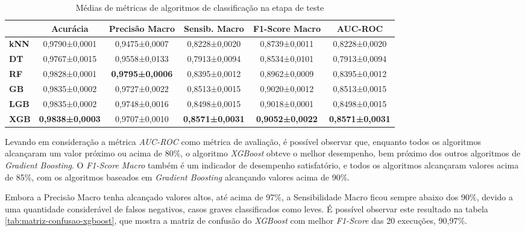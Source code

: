\begin{table}[H]
  \footnotesize
  \centering
  \begin{tabular}{l|c|c|c|c|c|}
  \cline{2-6}
  \textbf{}                          & \textbf{Acurácia}      & \textbf{Precisão Macro} & \textbf{Sensib. Macro} & \textbf{F1-Score Macro} & \textbf{AUC-ROC}       \\ \hline
  \multicolumn{1}{|l|}{\textbf{kNN}} & 0,9790±0,0001          & 0,9475±0,0007           & 0,8228±0,0020          & 0,8739±0,0011           & 0,8228±0,0020          \\ \hline
  \multicolumn{1}{|l|}{\textbf{DT}}  & 0,9767±0,0015          & 0,9558±0,0133           & 0,7913±0,0094          & 0,8534±0,0101           & 0,7913±0,0094          \\ \hline
  \multicolumn{1}{|l|}{\textbf{RF}}  & 0,9828±0,0001          & \textbf{0,9795±0,0006}  & 0,8395±0,0012          & 0,8962±0,0009           & 0,8395±0,0012          \\ \hline
  \multicolumn{1}{|l|}{\textbf{GB}}  & 0,9835±0,0002          & 0,9727±0,0022           & 0,8513±0,0015          & 0,9020±0,0012           & 0,8513±0,0015          \\ \hline
  \multicolumn{1}{|l|}{\textbf{LGB}} & 0,9835±0,0002          & 0,9748±0,0016           & 0,8498±0,0015          & 0,9018±0,0001           & 0,8498±0,0015          \\ \hline
  \multicolumn{1}{|l|}{\textbf{XGB}} & \textbf{0,9838±0,0003} & 0,9707±0,0010           & \textbf{0,8571±0,0031} & \textbf{0,9052±0,0022}  & \textbf{0,8571±0,0031} \\ \hline 
\end{tabular}
\caption{Médias de métricas de algoritmos de classificação na etapa de teste}
\label{tab:comparacao-algoritmos-normal}
\end{table}

Levando em consideração a métrica \textit{AUC-ROC} como métrica de avaliação, é possível observar que, enquanto todos os algoritmos alcançaram um valor próximo ou acima de 80\%, o algoritmo \textit{XGBoost} obteve o melhor desempenho, bem próximo dos outros algoritmos de \textit{Gradient Boosting}. O \textit{F1-Score Macro} também é um indicador de desempenho satisfatório, e todos os algoritmos alcançaram valores acima de 85\%, com os algoritmos baseados em \textit{Gradient Boosting} alcançando valores acima de 90\%. 

Embora a Precisão Macro tenha alcançado valores altos, até acima de 97\%, a Sensibilidade Macro ficou sempre abaixo dos 90\%, devido a uma quantidade considerável de falsos negativos, casos graves classificados como leves. É possível observar este resultado na tabela \ref{tab:matriz-confusao-xgboost}, que mostra a matriz de confusão do \textit{XGBoost} com melhor \textit{F1-Score} das 20 execuções, 90,97\%.

